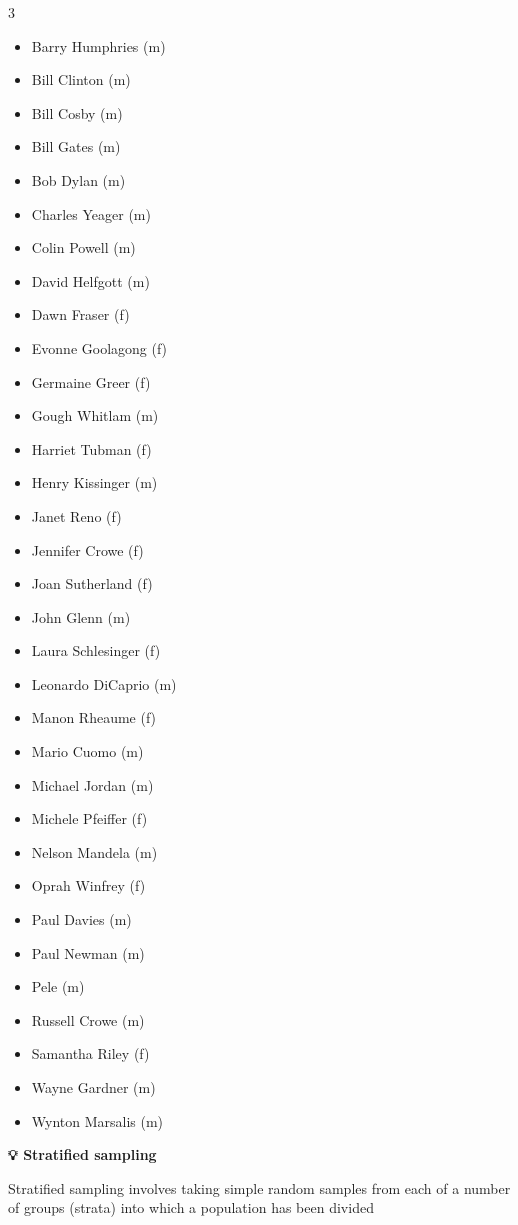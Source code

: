 \documentclass[
  11pt,
  oneside]{scrbook}
\begin{document}
\begin{multicols}{3}
\begin{itemize}
\item Barry Humphries (m)
\item Bill Clinton (m)
\item Bill Cosby (m)
\item Bill Gates (m)
\item Bob Dylan (m)
\item Charles Yeager (m)
\item Colin Powell (m)
\item David Helfgott (m)
\item Dawn Fraser (f)
\item Evonne Goolagong (f)
\item Germaine Greer (f)

\columnbreak

\item Gough Whitlam (m)
\item Harriet Tubman (f)
\item Henry Kissinger (m)
\item Janet Reno (f)
\item Jennifer Crowe (f)
\item Joan Sutherland (f)
\item John Glenn (m)
\item Laura Schlesinger (f)
\item Leonardo DiCaprio (m)
\item Manon Rheaume (f)
\item Mario Cuomo (m)

\columnbreak

\item Michael Jordan (m)
\item Michele Pfeiffer (f)
\item Nelson Mandela (m)
\item Oprah Winfrey (f)
\item Paul Davies (m)
\item Paul Newman (m)
\item Pele (m)
\item Russell Crowe (m)
\item Samantha Riley (f)
\item Wayne Gardner (m)
\item Wynton Marsalis (m)
\end{itemize}
\end{multicols}

\begin{tipbox}
\textbf{💡 Stratified sampling}

Stratified sampling involves taking simple random samples from each of a number of groups (strata) into which a population has been divided
\end{tipbox}
\end{document}
